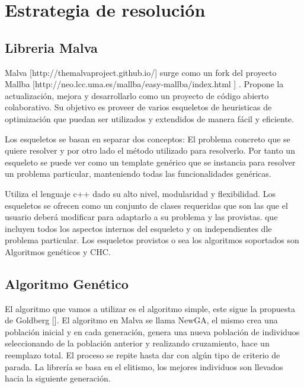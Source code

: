 \chapter{Estrategia de resolución}


\section{Libreria Malva}

Malva [http://themalvaproject.github.io/] surge como un fork del proyecto Mallba [http://neo.lcc.uma.es/mallba/easy-mallba/index.html ] . Propone la actualización, mejora y desarrollarlo como un proyecto de código abierto colaborativo.  Su objetivo es proveer de varios esqueletos de heuristicas de optimización que puedan ser utilizados y extendidos de manera fácil y eficiente.

Los esqueletos se basan en separar dos conceptos: El problema concreto que se quiere resolver y por otro lado el método utilizado para resolverlo. Por tanto un esqueleto se puede ver como un template genérico que se instancia para resolver un problema particular, manteniendo todas las funcionalidades genéricas.

Utiliza el lenguaje c++ dado su alto nivel, modularidad y flexibilidad. Los esqueletos se ofrecen como un conjunto de clases requeridas que son las que el usuario deberá modificar para adaptarlo a su problema y las provistas. que incluyen todos los aspectos internos del esqueleto y on independientes dle problema particular.
Los esqueletos provistos o sea los algoritmos soportados son Algoritmos genéticos y CHC.




\section{Algoritmo Genético}
El algoritmo que vamos a utilizar es el algoritmo simple, este
sigue  la  propuesta  de  Goldberg  [].  El  algoritmo  en  Malva  se
llama NewGA, el mismo crea una población inicial y en
cada  generación,  genera  una  nueva  población  de  individuos
seleccionando  de  la  población  anterior  y  realizando
cruzamiento,  hace  un  reemplazo  total.  El  proceso  se  repite
hasta  dar  con  algún  tipo  de  criterio  de parada.  La  librería se
basa en el elitismo, los mejores individuos son llevados hacia
la siguiente generación.


